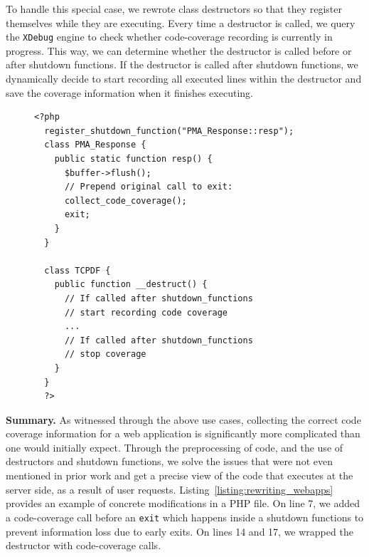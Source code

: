 To handle this special case, we rewrote class destructors so that they
register themselves while they are executing. Every time a destructor
is called, we query the \texttt{XDebug} engine to check whether code-coverage
recording is currently in progress. This way, we can determine whether the
destructor is called before or after shutdown functions. If the destructor
is called after shutdown functions, we dynamically decide to start recording
all executed lines within the destructor and save the coverage information
when it finishes executing.


\begin{figure}[t]
  \begin{lstlisting}[frame=single, caption={Code rewritten by the debloating framework to ensure correct code coverage of corner cases.},captionpos=b, label={listing:rewriting_webapps}]
  <?php
  register_shutdown_function("PMA_Response::resp");
  class PMA_Response {
    public static function resp() {
      $buffer->flush();
      // Prepend original call to exit:
      collect_code_coverage();
      exit;
    }
  }
  
  class TCPDF {
    public function __destruct() {
      // If called after shutdown_functions
      // start recording code coverage
      ...
      // If called after shutdown_functions
      // stop coverage
    }
  }
  ?>
  \end{lstlisting}
\end{figure}

\vspace{1ex}
\noindent\textbf{Summary.}
As witnessed through the above use cases, collecting the correct code coverage information
for a web application is significantly more complicated than one would
initially expect. Through the preprocessing of code, and the use of destructors
and shutdown functions, we solve the issues that were not even mentioned
in prior work and get a precise view of the code that executes at the server
side, as a result of user requests. Listing~\ref{listing:rewriting_webapps}
provides an example of concrete modifications in a PHP file. On line 7, we
added a code-coverage call before an \texttt{exit} which happens inside a shutdown functions to prevent information
loss due to early exits. On lines 14 and 17, we wrapped the destructor with
code-coverage calls.


